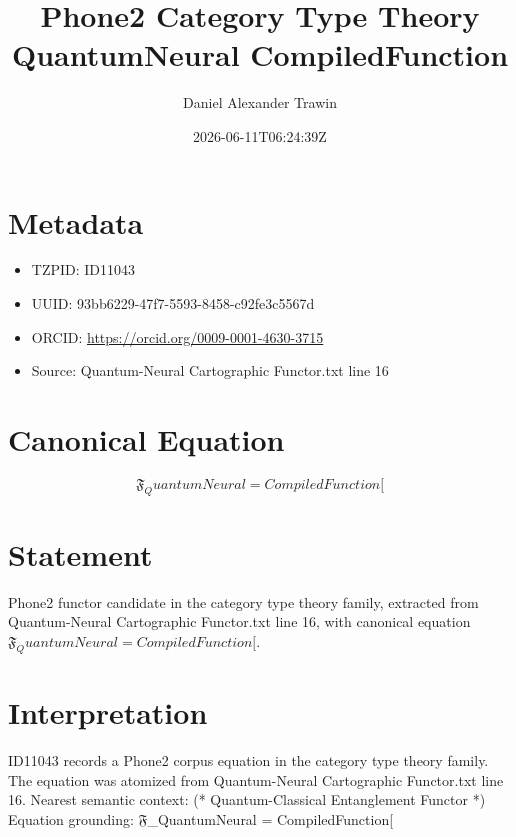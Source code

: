 \documentclass[11pt]{article}
\title{Phone2 Category Type Theory QuantumNeural CompiledFunction}
\author{Daniel Alexander Trawin}
\date{2026-06-11T06:24:39Z}
\begin{document}
\maketitle
\section*{Metadata}
\begin{itemize}
\item TZPID: ID11043
\item UUID: 93bb6229-47f7-5593-8458-c92fe3c5567d
\item ORCID: \url{https://orcid.org/0009-0001-4630-3715}
\item Source: Quantum-Neural Cartographic Functor.txt line 16
\end{itemize}
\section*{Canonical Equation}
\[
𝔉_QuantumNeural = CompiledFunction[
\]
\section*{Statement}
Phone2 functor candidate in the category type theory family, extracted from Quantum-Neural Cartographic Functor.txt line 16, with canonical equation $𝔉_QuantumNeural = CompiledFunction[$.
\section*{Interpretation}
ID11043 records a Phone2 corpus equation in the category type theory family. The equation was atomized from Quantum-Neural Cartographic Functor.txt line 16. Nearest semantic context: (* Quantum-Classical Entanglement Functor *) Equation grounding: 𝔉_QuantumNeural = CompiledFunction[
\end{document}
